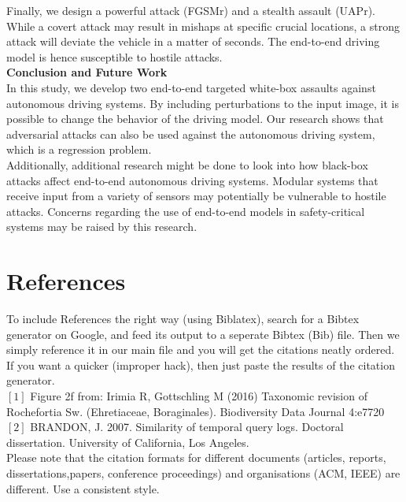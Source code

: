 \documentclass[ 12pt,a4paper,twocolumn,fleqn]{article}
\begin{document}
Finally, we design a powerful attack (FGSMr) and a stealth assault (UAPr). While a covert attack may result in mishaps at specific crucial locations, a strong attack will deviate the vehicle in a matter of seconds. The end-to-end driving model is hence susceptible to hostile attacks.\\


\textbf{\LARGE{Conclusion and Future Work}}\\
In this study, we develop two end-to-end targeted white-box assaults against autonomous driving systems. By including perturbations to the input image, it is possible to change the behavior of the driving model. Our research shows that adversarial attacks can also be used against the autonomous driving system, which is a regression problem.\\
Additionally, additional research might be done to look into how black-box attacks affect end-to-end autonomous driving systems. Modular systems that receive input from a variety of sensors may potentially be vulnerable to hostile attacks. Concerns regarding the use of end-to-end models in safety-critical systems may be raised by this research.\\



\section{References}

To include References the right way (using Biblatex), search for a Bibtex generator on Google, and feed its output to a seperate Bibtex (Bib) file. Then we simply reference it in our main file and you will get the citations neatly ordered. If you want a quicker (improper hack), then just paste the results of the citation generator. \\
$[1]$ Figure 2f from: Irimia R, Gottschling M (2016) Taxonomic revision of Rochefortia Sw. (Ehretiaceae, Boraginales). Biodiversity Data Journal 4:e7720 
\\
$[2]$ BRANDON, J. 2007. Similarity of temporal query logs. Doctoral dissertation. University of California, Los Angeles. \\

Please note that the citation formats for different documents (articles, reports, dissertations,papers, conference proceedings) and organisations (ACM, IEEE) are different. Use a consistent style.
\end{document}
